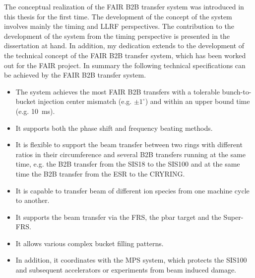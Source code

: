 

The conceptual realization of the FAIR B2B transfer system was introduced in this thesis for the first time. The development of the concept of the system involves mainly the timing and LLRF perspectives. The contribution to the development of the system from the timing perspective is presented in the dissertation at hand. In addition, my dedication extends to the development of the technical concept of the FAIR B2B transfer system, which has been worked out for the FAIR project. In summary the following technical specifications can be achieved by the FAIR B2B transfer system. 
\begin{itemize}
	\item The system achieves the most FAIR B2B transfers with a tolerable bunch-to-bucket injection center mismatch (e.g. $\pm 1^\circ$) and within an upper bound time (e.g. \SI{10}{\ms}). 
	\item It supports both the phase shift and frequency beating methods. 
	\item It is flexible to support the beam transfer between two rings with different ratios in their circumference and several B2B transfers running at the same time, e.g. the B2B transfer from the SIS18 to the SIS100 and at the same time the B2B transfer from the ESR to the CRYRING. 
	\item It is capable to transfer beam of different ion species from one machine cycle to another.
	\item It supports the beam transfer via the FRS, the pbar target and the Super-FRS. 
	\item It allows various complex bucket filling patterns. 
	\item In addition, it coordinates with the MPS system, which protects the SIS100 and subsequent accelerators or experiments from beam induced damage. 
\end{itemize}

